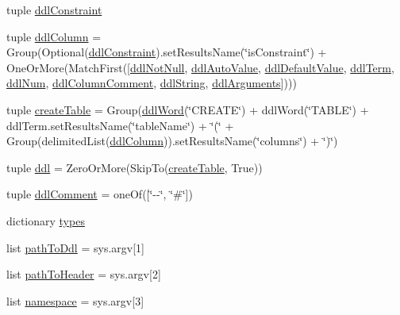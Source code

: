 \begin{DoxyCompactItemize}
tuple \hyperlink{namespaceddl2cpp_a97e4713ef26f221c7a6e84b47053bb04}{ddl\+Constraint}
\item 
tuple \hyperlink{namespaceddl2cpp_a0b84b33d051fb3679933a73f07862855}{ddl\+Column} = Group(Optional(\hyperlink{namespaceddl2cpp_a97e4713ef26f221c7a6e84b47053bb04}{ddl\+Constraint}).set\+Results\+Name(\char`\"{}is\+Constraint\char`\"{}) + One\+Or\+More(Match\+First(\mbox{[}\hyperlink{namespaceddl2cpp_a1b17bb7ebb70fb38c91d5e21923602f9}{ddl\+Not\+Null}, \hyperlink{namespaceddl2cpp_adfd7af04711f00ee8c041d1a9dc8a5ff}{ddl\+Auto\+Value}, \hyperlink{namespaceddl2cpp_a4952a8806e1ea497a7d3cf22334247ac}{ddl\+Default\+Value}, \hyperlink{namespaceddl2cpp_afdb0a60da961822931aa989528d42409}{ddl\+Term}, \hyperlink{namespaceddl2cpp_a4200c1285ee30e3c5069a13092e36b7b}{ddl\+Num}, \hyperlink{namespaceddl2cpp_acd5cc6bf8c3155c1d9b5c96f837a56da}{ddl\+Column\+Comment}, \hyperlink{namespaceddl2cpp_ac99a10e162c5dca8118f8f0a0661e378}{ddl\+String}, \hyperlink{namespaceddl2cpp_ae9ff0a4f026c9fd16644a14821c6ab34}{ddl\+Arguments}\mbox{]})))
\item 
tuple \hyperlink{namespaceddl2cpp_ac9fca86626a318c74c5ef09470e320e3}{create\+Table} = Group(\hyperlink{namespaceddl2cpp_aef0136dc79fef19dc9bcece9a6fd2396}{ddl\+Word}(\char`\"{}C\+R\+E\+A\+T\+E\char`\"{}) + ddl\+Word(\char`\"{}T\+A\+B\+L\+E\char`\"{}) + ddl\+Term.\+set\+Results\+Name(\char`\"{}table\+Name\char`\"{}) + \char`\"{}(\char`\"{} + Group(delimited\+List(\hyperlink{namespaceddl2cpp_a0b84b33d051fb3679933a73f07862855}{ddl\+Column})).set\+Results\+Name(\char`\"{}columns\char`\"{}) + \char`\"{})\char`\"{})
\item 
tuple \hyperlink{namespaceddl2cpp_ab4c4618946f516072a777b7c1f154366}{ddl} = Zero\+Or\+More(Skip\+To(\hyperlink{namespaceddl2cpp_ac9fca86626a318c74c5ef09470e320e3}{create\+Table}, True))
\item 
tuple \hyperlink{namespaceddl2cpp_a353ef6fb26a14fe2a057372cee430a52}{ddl\+Comment} = one\+Of(\mbox{[}\char`\"{}-\/-\/\char`\"{}, \char`\"{}\#\char`\"{}\mbox{]})
\item 
dictionary \hyperlink{namespaceddl2cpp_aa60a82f28e1ca899d699db901e2de22b}{types}
\item 
list \hyperlink{namespaceddl2cpp_a21ffb333ce42da19ce242bfe204b34cc}{path\+To\+Ddl} = sys.\+argv\mbox{[}1\mbox{]}
\item 
list \hyperlink{namespaceddl2cpp_a9098aa495b84a1827935d4d3068775dd}{path\+To\+Header} = sys.\+argv\mbox{[}2\mbox{]}
\item 
list \hyperlink{namespaceddl2cpp_ab0de067ca1d9cc93a2d1e548bb283bb8}{namespace} = sys.\+argv\mbox{[}3\mbox{]}

\end{DoxyCompactItemize}
